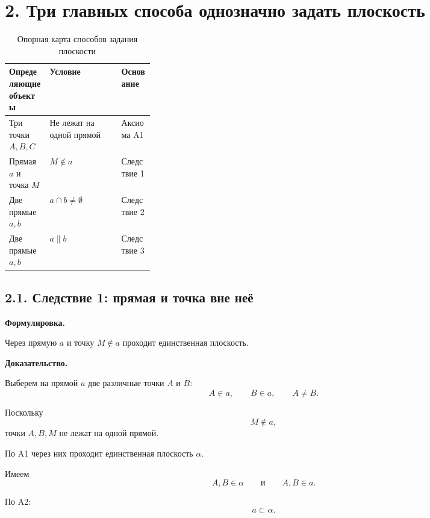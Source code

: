 \documentclass[a4paper,12pt]{article}
\newcommand{\term}[1]{\textbf{\textcolor{darkaccent}{#1}}}
\begin{document}

\section*{2. Три главных способа однозначно задать плоскость}

\begin{table}[htbp]
\centering
\caption{Опорная карта способов задания плоскости}

\begin{tabularx}{\linewidth}{
    @{}
    p{0.28\linewidth}
    X
    X
    @{}
}
\toprule
\textbf{Определяющие объекты}
&
\textbf{Условие}
&
\textbf{Основание}
\\
\midrule

Три точки $A,B,C$
&
Не лежат на одной прямой
&
Аксиома A1
\\

Прямая $a$ и точка $M$
&
$M\notin a$
&
Следствие 1
\\

Две прямые $a,b$
&
$a\cap b\ne\emptyset$
&
Следствие 2
\\

Две прямые $a,b$
&
$a\parallel b$
&
Следствие 3
\\

\bottomrule
\end{tabularx}
\end{table}


\subsection*{2.1. Следствие 1: прямая и точка вне неё}

\term{Формулировка.}

Через прямую $a$ и точку $M\notin a$
проходит единственная плоскость.

\textbf{Доказательство.}

Выберем на прямой $a$ две различные точки $A$ и $B$:
\[
A\in a,
\qquad
B\in a,
\qquad
A\ne B.
\]

Поскольку
\[
M\notin a,
\]
точки $A,B,M$ не лежат на одной прямой.

По A1 через них проходит единственная плоскость $\alpha$.

Имеем
\[
A,B\in\alpha
\qquad\text{и}\qquad
A,B\in a.
\]

По A2:
\[
a\subset\alpha.
\]
\end{document}

